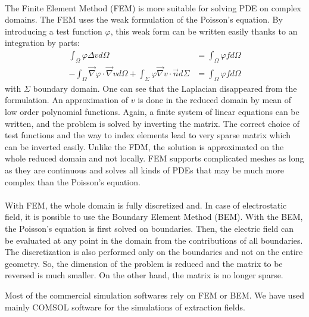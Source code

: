 \begin{refsection}
  \paragraph{}
  The Finite Element Method (FEM) is more suitable for solving PDE on complex domains. The FEM uses the weak formulation of the Poisson’s equation. By introducing a test function $\varphi$, this weak form can be written easily thanks to an integration by parts:
  \begin{align}
    \int_{\Omega}^{} \varphi \Delta v d\Omega                                                                                           & = \int_{\Omega}^{} \varphi f d\Omega \\
    -\int_{\Omega}^{} \vec{\nabla} \varphi \cdot \vec{\nabla} v d\Omega + \int_{\Sigma}^{} \varphi \vec{\nabla} v \cdot \vec{n} d\Sigma & = \int_{\Omega}^{} \varphi f d\Omega
  \end{align}
  with $\Sigma$ boundary domain.
  One can see that the Laplacian disappeared from the formulation. An approximation of $v$ is done in the reduced domain by mean of low order polynomial functions. Again, a finite system of linear equations can be written, and the problem is solved by inverting the matrix. The correct choice of test functions and the way to index elements lead to very sparse matrix which can be inverted easily. Unlike the FDM, the solution is approximated on the whole reduced domain and not locally. FEM supports complicated meshes as long as they are continuous and solves all kinds of PDEs that may be much more complex than the Poisson’s equation.

  \paragraph{}
  With FEM, the whole domain is fully discretized and. In case of electrostatic field, it is possible to use the Boundary Element Method (BEM). With the BEM, the Poisson’s equation is first solved on boundaries. Then, the electric field can be evaluated at any point in the domain from the contributions of all boundaries. The discretization is also performed only on the boundaries and not on the entire geometry. So, the dimension of the problem is reduced and the matrix to be reversed is much smaller. On the other hand, the matrix is ​​no longer sparse.

  Most of the commercial simulation softwares \cite{cststudio2018,ansys2018,couloumb2018} rely on FEM or BEM. We have used mainly COMSOL software for the simulations of extraction fields.


\end{refsection}
